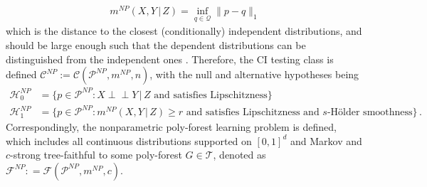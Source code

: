 \documentclass{article}
\theoremstyle{definition}
\theoremstyle{definition}
\theoremstyle{definition}
\theoremstyle{definition}
\theoremstyle{definition}
\theoremstyle{definition}
\theoremstyle{remark}
\theoremstyle{remark}
\newcommand{\AND}{\text{ and }}
\newcommand{\given}{\,|\,}
\newcommand{\indep}{\perp \!\!\! \perp }
\newcommand{\pltr}{\mathcal{T}}
\newcommand{\dpdm}{m}
\newcommand{\dd}{d}
\newcommand{\ciclass}{\mathcal{C}}
\newcommand{\pfclass}{\mathcal{F}}
\newcommand{\hone}{\mathcal{H}_1}
\newcommand{\hzero}{\mathcal{H}_0}
\begin{document}
\begin{align*}
    \dpdm^{NP}(X,Y\given Z) = \inf_{q\in \mathcal{Q}} \|p - q\|_1
\end{align*}
which is the distance to the closest (conditionally) independent distributions, and should be large enough such that the dependent distributions can be distinguished from the independent ones \citep{shah2020hardness}.
Therefore, the CI testing class is defined $\ciclass^{NP}:=\ciclass(\mathcal{P}^{NP},\dpdm^{NP},n)$, with the null and alternative hypotheses being
\begin{align*}
    \hzero^{NP} &= \{p\in \mathcal{P}^{NP}: X\indep Y\given Z \AND \text{satisfies Lipschitzness}\} \\ 
    \hone^{NP} &= \{p\in \mathcal{P}^{NP}: \dpdm^{NP}(X,Y\given Z) \ge r \AND \text{satisfies Lipschitzness and $s$-H\"older smoothness}\} \,.
\end{align*}
Correspondingly, the nonparametric poly-forest learning problem is defined, which includes all continuous distributions supported on $[0,1]^\dd$ and Markov and $c$-strong tree-faithful to some poly-forest $G\in \pltr$, denoted as $\pfclass^{NP}: = \pfclass(\mathcal{P}^{NP},\dpdm^{NP},c)$. 
\end{document}
